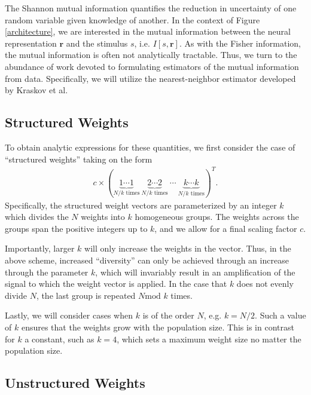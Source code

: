 \documentclass[12pt]{article}
\begin{document}
The Shannon mutual information quantifies the reduction in uncertainty of one random variable given knowledge of another. In the context of Figure \ref{architecture}, we are interested in the mutual information between the neural representation $\mathbf{r}$ and the stimulus $s$, i.e. $I[s, \mathbf{r}]$. As with the Fisher information, the mutual information is often not analytically tractable. Thus, we turn to the abundance of work devoted to formulating estimators of the mutual information from data. Specifically, we will utilize the nearest-neighbor estimator developed by Kraskov et al. 
\subsection{Structured Weights}
To obtain analytic expressions for these quantities, we first consider the case of ``structured weights'' taking on the form
\begin{align}
c \times \left(\underbrace{1 \cdots 1}_{N/k \text{ times}}  \ \underbrace{2 \cdots 2}_{N/k \text{ times}} \ \cdots \ \underbrace{k \cdots k}_{N/k \text{ times}}   \right)^T.
\end{align}
Specifically, the structured weight vectors are parameterized by an integer $k$ which divides the $N$ weights into $k$ homogeneous groups. The weights across the groups span the positive integers up to $k$, and we allow for a final scaling factor $c$. 

Importantly,  larger $k$ will only increase the weights in the vector. Thus, in the above scheme, increased ``diversity'' can only be achieved through an increase through the parameter $k$, which will invariably result in an amplification of the signal to which the weight vector is applied. In the case that $k$ does not evenly divide $N$, the last group is repeated $N\text{mod }k$ times.

Lastly, we will consider cases when $k$ is of the order $N$, e.g. $k = N/2$. Such a value of $k$ ensures that the weights grow with the population size. This is in contrast for $k$ a constant, such as $k=4$, which sets a maximum weight size no matter the population size. 
\subsection{Unstructured Weights}
\end{document}

